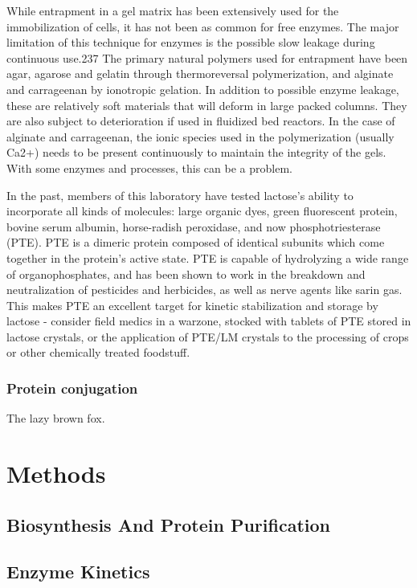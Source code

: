 \begin{refsection}
While entrapment in a gel matrix has been extensively used for the
immobilization of cells, it has not been as common for free enzymes. The major
limitation of this technique for enzymes is the possible slow leakage during
continuous use.237 The primary natural polymers used for entrapment have been
agar, agarose and gelatin through thermoreversal polymerization, and alginate
and carrageenan by ionotropic gelation. In addition to possible enzyme leakage,
these are relatively soft materials that will deform in large packed columns.
They are also subject to deterioration if used in fluidized bed reactors. In
the case of alginate and carrageenan, the ionic species used in the
polymerization (usually Ca2+) needs to be present continuously to maintain the
integrity of the gels. With some enzymes and processes, this can be a problem.

In the past, members of this laboratory have tested lactose's ability to
incorporate all kinds of molecules: large organic dyes, green fluorescent
protein, bovine serum albumin, horse-radish peroxidase, and now
phosphotriesterase (PTE). PTE is a dimeric protein composed of identical
subunits which come together in the protein's active state. PTE is capable of
hydrolyzing a wide range of organophosphates, and has been shown to work in the
breakdown and neutralization of pesticides and herbicides, as well as nerve
agents like sarin gas. This makes PTE an excellent target for kinetic
stabilization and storage by lactose - consider field medics in a warzone,
stocked with tablets of PTE stored in lactose crystals, or the application of
PTE/LM crystals to the processing of crops or other chemically treated
foodstuff.

\subsubsection{Protein conjugation}

The lazy brown fox.

\section{Methods}

\subsection{Biosynthesis And Protein Purification}

\subsection{Enzyme Kinetics}


\end{refsection}
